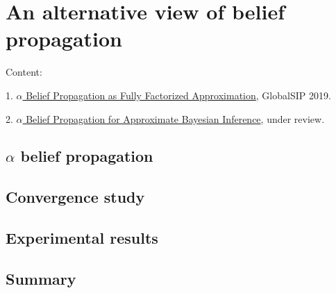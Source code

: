 \chapter{An alternative view of belief propagation}
Content:

1. \href{https://ieeexplore.ieee.org/abstract/document/8969545}{$\alpha$ Belief Propagation as Fully Factorized Approximation}, GlobalSIP 2019.

2. \href{https://github.com/FirstHandScientist/alpha-bp/blob/submit_icml/manuscript/main.pdf}{$\alpha$ Belief Propagation for Approximate Bayesian Inference}, under review.

\section{$\alpha$ belief propagation}

\section{Convergence study}

\section{Experimental results}
\section{Summary}


